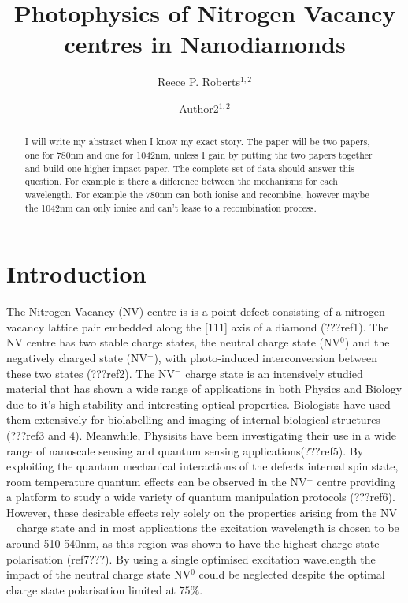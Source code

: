 \documentclass[preprint,prl,twocolumn]{revtex4}
\begin{document}
\title{Photophysics of Nitrogen Vacancy centres in Nanodiamonds}
  
\author{Reece P. Roberts$^{1,2}$}
\author{Author2$^{1,2}$}



\begin{abstract}
I will write my abstract when I know my exact story.
The paper will be two papers, one for 780nm and one for 1042nm, unless I gain by putting the two papers together and build one higher impact paper.
The complete set of data should answer this question.
For example is there a difference between the mechanisms for each wavelength. For example the 780nm can both ionise and recombine, however maybe the 1042nm can only ionise and can't lease to a recombination process.
\end{abstract}

\maketitle

\section{Introduction}
The Nitrogen Vacancy (NV) centre is is a point defect consisting of a nitrogen-vacancy lattice pair embedded along the [111] axis of a diamond (???ref1). The NV centre has two stable charge states, the neutral charge state (NV$^0$) and the negatively charged state (NV$^-$), with photo-induced interconversion between these two states (???ref2). The NV$^-$ charge state is an intensively studied material that has shown a wide range of applications in both Physics and Biology due to it's high stability and interesting optical properties. Biologists have used them extensively for biolabelling and imaging of internal biological structures (???ref3 and 4). Meanwhile, Physisits have been investigating their use in a wide range of nanoscale sensing and quantum sensing applications(???ref5). By exploiting the quantum mechanical interactions of the defects internal spin state, room temperature quantum effects can be observed in the NV$^-$ centre providing a platform to study a wide variety of quantum manipulation protocols (???ref6). However, these desirable effects rely solely on the properties arising from the NV$^-$ charge state and in most applications the excitation wavelength is chosen to be around 510-540nm, as this region was shown to have the highest charge state polarisation (ref7???). By using a single optimised excitation wavelength the impact of the neutral charge state NV$^0$ could be neglected despite the optimal charge state polarisation limited at $75\%$. 
\end{document}
